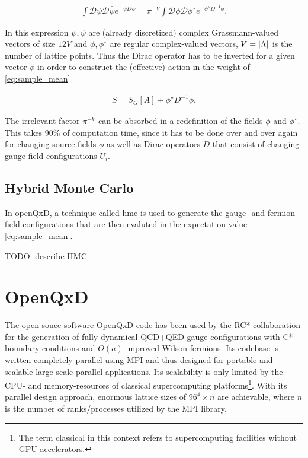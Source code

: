 \documentclass{article}
\theoremstyle{plain} %
\theoremstyle{convention} %
\theoremstyle{remark} %
\numberwithin{equation}{section}
\begin{document}
\begin{align*}
  \int \mathcal{D}\psi \mathcal{D} \bar{\psi} e^{ - \bar{\psi} D \psi } = \pi^{-V} \int \mathcal{D}\phi \mathcal{D} \phi^{\star} e^{ - \phi^{\star} D^{-1} \phi }.
\end{align*}

In this expression $\psi, \bar{\psi}$ are (already discretized) complex Grassmann-valued vectors of size $12 V$ and $\phi, \phi^{\star}$ are regular complex-valued vectors, $V = \abs{\Lambda}$ is the number of lattice points. Thus the Dirac operator has to be inverted for a given vector $\phi$ in order to construct the (effective) action in the weight of \eqref{eq:sample_mean}

\begin{align*}
  S = S_G[A] + \phi^{\star} D^{-1} \phi.
\end{align*}

The irrelevant factor $\pi^{-V}$ can be absorbed in a redefinition of the fields $\phi$ and $\phi^{\star}$. This takes \num{90}\% of computation time, since it has to be done over and over again for changing source fields $\phi$ as well as Dirac-operators $D$ that consist of changing gauge-field configurations $U_i$.

\subsection{Hybrid Monte Carlo}

In openQxD, a technique called \acrfull{hmc} is used to generate the gauge- and fermion-field configurations that are then evaluted in the expectation value \eqref{eq:sample_mean}.

TODO: describe HMC

\section{OpenQxD}

\label{sec:openqxd}

The open-souce software OpenQxD code has been used by the RC* collaboration for the generation of fully dynamical QCD+QED gauge configurations with C* boundary conditions and $O(a)$-improved Wilson-fermions. Its codebase is written completely parallel using MPI and thus designed for portable and scalable large-scale parallel applications. Its scalability is only limited by the CPU- and memory-resources of classical supercomputing platforms\footnote{The term classical in this context refers to supercomputing facilities without GPU accelerators.}. With its parallel design approach, enormous lattice sizes of $96^4 \times n$ are achievable, where $n$ is the number of ranks/processes utilized by the MPI library.
\end{document}
